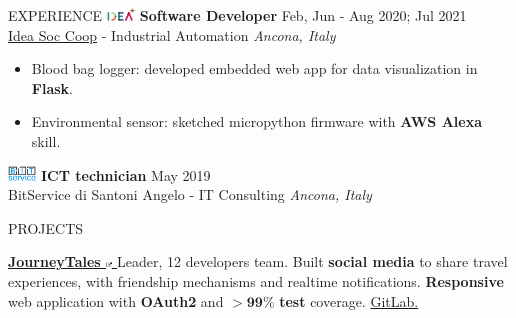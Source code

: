 \documentclass{cv} %
\def\intraexpvspace{0.15cm}
\begin{document}
\begin{minipage}[b][0.9\paperheight][t]{0.7\linewidth}
\begin{rSection}{EXPERIENCE}
        \includegraphics[width=0.75cm, trim={0cm 1.5cm 0cm 0cm}]{idea-icon.png}
        \textbf{Software Developer} \hfill Feb, Jun - Aug 2020; Jul 2021\\
        \hspace*{0.85cm}\href{https://idea-on-line.it/}{Idea Soc Coop} - Industrial Automation
        \hfill \textit{Ancona, Italy}
        \begin{itemize}
            \item Blood bag logger:
                  developed embedded web app for data visualization in \textbf{Flask}.

            \item Environmental sensor:
                  sketched micropython firmware with \textbf{AWS Alexa} skill.
        \end{itemize}
        \vspace{\intraexpvspace}
        \vspace{\intraexpvspace}

        \includegraphics[width=0.75cm, trim={0cm 1.5cm 0cm 0cm}]{bitservice-icon.png}
        \textbf{ICT technician} \hfill May 2019 \\
        \hspace*{0.85cm}BitService di Santoni Angelo - IT Consulting
        \hfill \textit{Ancona, Italy}
    \end{rSection}

    \begin{rSection}{PROJECTS}
        \item \textbf{\href{https://pufferfish.sa4.usi.ch/login}
            {
                JourneyTales
                \includegraphics[width=0.15cm, trim={10cm -10cm 0cm 0cm}]{ext-link-icon.png}
            }}
        {Leader, 12 developers team.
            Built \textbf{social media} to share travel experiences,
            with friendship mechanisms and realtime notifications.
            \textbf{Responsive} web application with \textbf{OAuth2} and $\boldsymbol{> 99\%}$ \textbf{test} coverage.
            \href{https://gitlab.com/usi-si-oss/teaching/projects-showcase/sa4/team-4-pufferfish}{GitLab.}
        }


\end{rSection}
\end{minipage}
\end{document}
